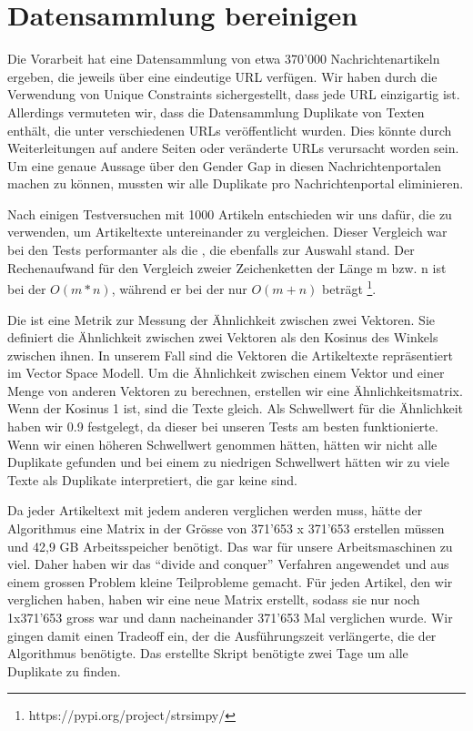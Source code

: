 \newpage
\section{Datensammlung bereinigen}

Die Vorarbeit hat eine Datensammlung von etwa 370'000 Nachrichtenartikeln ergeben, die jeweils über eine eindeutige URL verfügen. 
Wir haben durch die Verwendung von Unique Constraints sichergestellt, dass jede URL einzigartig ist. 
Allerdings vermuteten wir, dass die Datensammlung Duplikate von Texten enthält, die unter verschiedenen URLs veröffentlicht wurden. 
Dies könnte durch Weiterleitungen auf andere Seiten oder veränderte URLs verursacht worden sein. 
Um eine genaue Aussage über den Gender Gap in diesen Nachrichtenportalen machen zu können, mussten wir alle Duplikate pro Nachrichtenportal eliminieren. 

Nach einigen Testversuchen mit 1000 Artikeln entschieden wir uns dafür, die  zu verwenden, um Artikeltexte untereinander zu vergleichen. 
Dieser Vergleich war bei den Tests performanter als die , die ebenfalls zur Auswahl stand. 
Der Rechenaufwand für den Vergleich zweier Zeichenketten der Länge m bzw. n ist bei der  
\(O(m*n)\), während er bei der  nur \(O(m+n)\) beträgt
\footnote{https://pypi.org/project/strsimpy/}.

Die  ist eine Metrik zur Messung der Ähnlichkeit zwischen zwei Vektoren.
Sie definiert die Ähnlichkeit zwischen zwei Vektoren als den Kosinus des Winkels zwischen ihnen.
In unserem Fall sind die Vektoren die Artikeltexte repräsentiert im Vector Space Modell. 
Um die Ähnlichkeit zwischen einem Vektor und einer Menge von anderen Vektoren zu berechnen, erstellen wir eine Ähnlichkeitsmatrix. 
Wenn der Kosinus 1 ist, sind die Texte gleich. 
Als Schwellwert für die Ähnlichkeit haben wir 0.9 festgelegt, da dieser bei unseren Tests am besten funktionierte. 
Wenn wir einen höheren Schwellwert genommen hätten, hätten wir nicht alle Duplikate gefunden und bei einem zu niedrigen Schwellwert
hätten wir zu viele Texte als Duplikate interpretiert, die gar keine sind. 

Da jeder Artikeltext mit jedem anderen verglichen werden muss, hätte der Algorithmus eine Matrix in der Grösse 
von 371'653 x 371'653 erstellen müssen und 42,9 GB Arbeitsspeicher benötigt. 
Das war für unsere Arbeitsmaschinen zu viel. 
Daher haben wir das \enquote{divide and conquer} Verfahren angewendet und aus einem grossen Problem kleine Teilprobleme gemacht. 
Für jeden Artikel, den wir verglichen haben, haben wir eine neue Matrix erstellt, sodass sie nur noch 1x371'653 gross war und dann nacheinander 371'653 Mal verglichen wurde. 
Wir gingen damit einen Tradeoff ein, der die Ausführungszeit verlängerte, die der Algorithmus benötigte. Das erstellte Skript benötigte zwei Tage um alle Duplikate zu finden.

